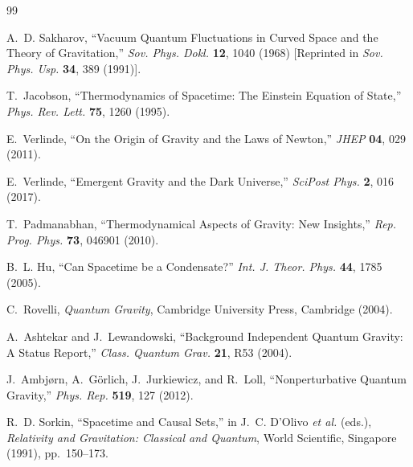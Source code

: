 \documentclass[pdflatex,sn-mathphys-num]{sn-jnl}%
\theoremstyle{thmstyleone}%
\theoremstyle{thmstyletwo}%
\theoremstyle{thmstylethree}%
\begin{document}
\begin{thebibliography}{99}

A.~D. Sakharov,
``Vacuum Quantum Fluctuations in Curved Space and the Theory
of Gravitation,''
\textit{Sov. Phys. Dokl.} \textbf{12}, 1040 (1968) 
[Reprinted in \textit{Sov. Phys. Usp.} \textbf{34}, 389 (1991)].

T.~Jacobson,
``Thermodynamics of Spacetime: The Einstein Equation of State,''
\textit{Phys. Rev. Lett.} \textbf{75}, 1260 (1995).

E.~Verlinde,
``On the Origin of Gravity and the Laws of Newton,''
\textit{JHEP} \textbf{04}, 029 (2011).

E.~Verlinde,
``Emergent Gravity and the Dark Universe,''
\textit{SciPost Phys.} \textbf{2}, 016 (2017).

T.~Padmanabhan,
``Thermodynamical Aspects of Gravity: New Insights,''
\textit{Rep. Prog. Phys.} \textbf{73}, 046901 (2010).

B.~L. Hu,
``Can Spacetime be a Condensate?''
\textit{Int. J. Theor. Phys.} \textbf{44}, 1785 (2005).

C.~Rovelli,
\textit{Quantum Gravity},
Cambridge University Press, Cambridge (2004).

A.~Ashtekar and J.~Lewandowski,
``Background Independent Quantum Gravity: A Status Report,''
\textit{Class. Quantum Grav.} \textbf{21}, R53 (2004).

J.~Ambj{\o}rn, A.~G\"orlich, J.~Jurkiewicz, and R.~Loll,
``Nonperturbative Quantum Gravity,''
\textit{Phys. Rep.} \textbf{519}, 127 (2012).

R.~D. Sorkin,
``Spacetime and Causal Sets,''
in J.~C. D'Olivo \textit{et al.} (eds.),
\textit{Relativity and Gravitation: Classical and Quantum},
World Scientific, Singapore (1991), pp.~150--173.


\end{thebibliography}
\end{document}
